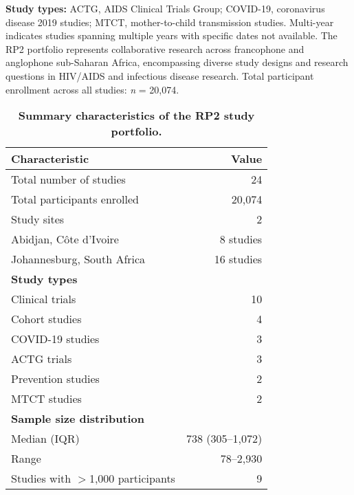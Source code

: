 \documentclass[11pt]{article}
\begin{document}
\vspace{0.5cm}
\footnotesize
\noindent\textbf{Study types:} ACTG, AIDS Clinical Trials Group; COVID-19, coronavirus disease 2019 studies; MTCT, mother-to-child transmission studies. Multi-year indicates studies spanning multiple years with specific dates not available. The RP2 portfolio represents collaborative research across francophone and anglophone sub-Saharan Africa, encompassing diverse study designs and research questions in HIV/AIDS and infectious disease research. Total participant enrollment across all studies: \textit{n} = 20,074.

\begin{table}[!htbp]
\centering
\caption{\textbf{Summary characteristics of the RP2 study portfolio.}}
\label{tab:rp2_summary}
\small
\begin{tabular}{@{}lr@{}}
\toprule
\textbf{Characteristic} & \textbf{Value} \\
\midrule
Total number of studies & 24 \\
Total participants enrolled & 20,074 \\
Study sites & 2 \\
\quad Abidjan, Côte d'Ivoire & 8 studies \\
\quad Johannesburg, South Africa & 16 studies \\
\midrule
\textbf{Study types} & \\
\quad Clinical trials & 10 \\
\quad Cohort studies & 4 \\
\quad COVID-19 studies & 3 \\
\quad ACTG trials & 3 \\
\quad Prevention studies & 2 \\
\quad MTCT studies & 2 \\
\midrule
\textbf{Sample size distribution} & \\
\quad Median (IQR) & 738 (305--1,072) \\
\quad Range & 78--2,930 \\
\quad Studies with $>$1,000 participants & 9 \\
\bottomrule
\end{tabular}
\end{table}
\end{document}
